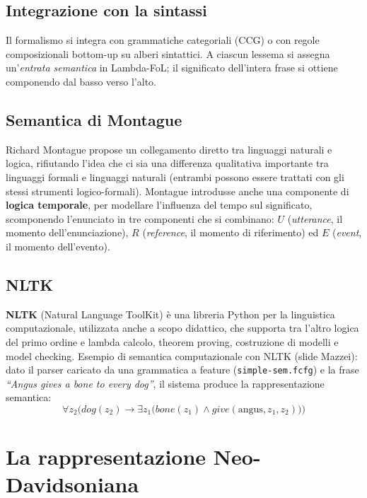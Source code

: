\documentclass[12pt,a4paper]{article}
\begin{document}
\subsection{Integrazione con la sintassi}
Il formalismo si integra con grammatiche categoriali (CCG) o con regole composizionali bottom-up su alberi sintattici. A ciascun lessema si assegna un'\emph{entrata semantica} in Lambda-FoL; il significato dell'intera frase si ottiene componendo dal basso verso l'alto.

\subsection{Semantica di Montague}

Richard Montague propose un collegamento diretto tra linguaggi naturali e logica, rifiutando l'idea che ci sia una differenza qualitativa importante tra linguaggi formali e linguaggi naturali (entrambi possono essere trattati con gli stessi strumenti logico-formali). Montague introdusse anche una componente di \textbf{logica temporale}, per modellare l'influenza del tempo sul significato, scomponendo l'enunciato in tre componenti che si combinano: $U$ (\emph{utterance}, il momento dell'enunciazione), $R$ (\emph{reference}, il momento di riferimento) ed $E$ (\emph{event}, il momento dell'evento).

\subsection{NLTK}

\textbf{NLTK} (Natural Language ToolKit) è una libreria Python per la linguistica computazionale, utilizzata anche a scopo didattico, che supporta tra l'altro logica del primo ordine e lambda calcolo, theorem proving, costruzione di modelli e model checking. Esempio di semantica computazionale con NLTK (slide Mazzei): dato il parser caricato da una grammatica a feature (\texttt{simple-sem.fcfg}) e la frase \textit{``Angus gives a bone to every dog''}, il sistema produce la rappresentazione semantica:
\[
\forall z_2\bigl(\mathit{dog}(z_2) \rightarrow \exists z_1\bigl(\mathit{bone}(z_1) \wedge \mathit{give}(\text{angus}, z_1, z_2)\bigr)\bigr)
\]

\section{La rappresentazione Neo-Davidsoniana}
\end{document}
